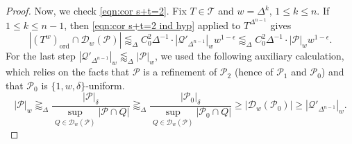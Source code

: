 \documentclass{amsart}
\newcommand{\T}{\mathcal{T}}
\newcommand{\leapp}{\lessapprox}
\newcommand{\geapp}{\gtrapprox}
\newcommand{\bp}{\mathbf{p}}
\newcommand{\bT}{\mathbf{T}}
\newcommand{\cD}{\mathcal{D}}
\newcommand{\cT}{\mathcal{T}}
\newcommand{\cQ}{\mathcal{Q}}
\newcommand{\cP}{\mathcal{P}}
\newcommand{\ord}{\mathrm{ord}}
\begin{document}
\begin{proof}
Now, we check \eqref{eqn:cor s+t=2}. Fix $T \in \T$ and $w = \Delta^k$, $1 \le k \le n$. If $1 \le k \le n-1$, then \eqref{eqn:cor s+t=2 ind hyp} applied to $T^{\Delta^{n-1}}$ gives
\begin{equation*}
    |(T^w)_\ord \cap \cD_w (\cP)| \lessapprox_{\Delta} C_0^2 \Delta^{-1} \cdot |\cQ'_{\Delta^{n-1}}|_w w^{1-\epsilon} \leapp_\Delta C_0^2 \Delta^{-1} \cdot |\cP|_w w^{1-\epsilon}.
\end{equation*}
For the last step $|\cQ'_{\Delta^{n-1}}|_w \leapp_\Delta |\cP|_w$, we used the following auxiliary calculation, which relies on the facts that $\cP$ is a refinement of $\cP_2$ (hence of $\cP_1$ and $\cP_0$) and that $\cP_0$ is $\{ 1, w, \delta \}$-uniform.%
\begin{equation*}
    |\cP|_w \geapp_\Delta \frac{|\cP|_\delta}{\sup_{Q \in \cD_w (\cP)} |\cP \cap Q|} \geapp_\Delta \frac{|\cP_0|_\delta}{\sup_{Q \in \cD_w (\cP)} |\cP_0 \cap Q|} \ge |\cD_w (\cP_0)| \ge |\cQ'_{\Delta^{n-1}}|_w.
\end{equation*}


     




\end{proof}
\end{document}
